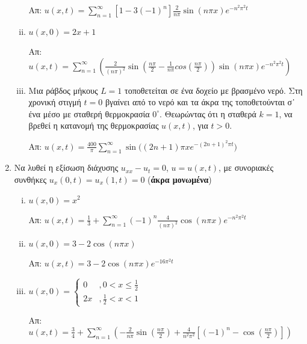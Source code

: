 \begin{enumerate}
\begin{enumerate}[(i)]
			\hfill Απ: $ u(x,t) = \sum_{n=1}^{\infty}[1-3(-1)^{n}] \frac{ 2 }{ n\pi } \sin{(n\pi x)}
			e^{-n^{2} \pi ^{2} t} $
			 
		\item $ u(x,0) = 2x+1 $

			\hfill Απ: $ u(x,t) = \sum_{n=1}^{\infty} (\frac{ 2 }{ (n\pi)^{2}} \sin{(\frac{ n\pi }{
			2 } - \frac{1}{ n\pi } cos(\frac{ n\pi }{ 2 }))} \sin{( n\pi x )} e^{-n^{2}\pi^{2}t}) $

		\item Μια ράβδος μήκους $L=1$ τοποθετείται σε ένα δοχείο με βρασμένο νερό. Στη χρονική
			στιγμή $ t=0 $ βγαίνει από το νερό και τα άκρα της τοποθετούνται σ᾽ ένα μέσο με σταθερή
			θερμοκρασία $ 0^{\circ}  $. Θεωρώντας ότι η σταθερά $ k=1 $, να βρεθεί η κατανομή
			της θερμοκρασίας $ u(x,t) $, για $ t>0 $.

			\hfill Απ: $ u(x,t) = \frac{ 400 }{ \pi } \sum_{n=1}^{\infty} \sin{((2n+1) \pi
			x}e^{-(2n+1)^{2}\pi t} ) $

		\end{enumerate}

	\item Να λυθεί η εξίσωση διάχυσης $ u_{xx} - u_t = 0 $, $ u=u(x,t) $, με συνοριακές συνθήκες $
		u_x(0,t) = u_x(1,t) = 0 $ ({\bfseries άκρα μονωμένα})

		\begin{enumerate}[(i)]
			\item $u(x,0) = x^{2}$ 

				\hfill Απ: $ u(x,t) = \frac{1}{ 3 } + \sum_{n=1}^{\infty} (-1)^{n} \frac{ 4 }{
				(n\pi)^{2}} \cos{(n\pi x)} e^{-n^{2}\pi^{2}t} $

			\item $ u(x,0) = 3 - 2 \cos{(n\pi x)}  $

				\hfill Απ: $ u(x,t) = 3 - 2 \cos{(n\pi x)} e^{-16\pi^{2}t} $

			\item $ u(x,0) = \begin{cases} 0 &, 0<x\leq \frac{ 1 }{ 2 } \\ 2x &, \frac{1}{ 2 }
					<x <1 
		\end{cases}$

					\hfill Απ: $ u(x,t) = \frac{ 3 }{ 4 } + \sum_{n=1}^{\infty}\left(- \frac{ 2 }{
						n\pi } \sin{\left(\frac{ n\pi }{ 2 }\right)}+ \frac{ 4 }{ n^{2} \pi ^{2} }\left[(-1)^{n}-
					\cos{\left(\frac{ n\pi }{ 2 }\right)}\right]\right)  $

\end{enumerate}



\end{enumerate}
